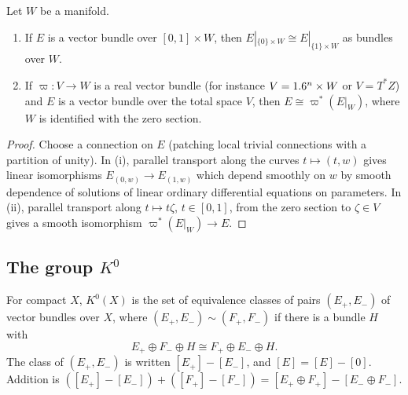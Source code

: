 \begin{lemma}\label{bott:lem:bundle-homotopy}
  Let $W$ be a manifold.
  \begin{enumerate}[label=(\roman*)]
  \item If $E$ is a vector bundle over $[0,1]\times W$, then
    $E|_{\{0\}\times W}\cong E|_{\{1\}\times W}$ as bundles over $W$.
  \item If $\varpi\colon V\to W$ is a real vector bundle (for instance $V=1.6^n\times W$
    or $V=T^*Z$) and $E$ is a vector bundle over the total space $V$, then
    $E\cong\varpi^*(E|_{W})$, where $W$ is identified with the zero section.
  \end{enumerate}
\end{lemma}
\begin{proof}
  Choose a connection on $E$ (patching local trivial connections with a partition
  of unity). In (i), parallel transport along the curves $t\mapsto(t,w)$ gives linear
  isomorphisms $E_{(0,w)}\to E_{(1,w)}$ which depend smoothly on $w$ by smooth
  dependence of solutions of linear ordinary differential equations on parameters.
  In (ii), parallel transport along $t\mapsto t\zeta$, $t\in[0,1]$, from the zero
  section to $\zeta\in V$ gives a smooth isomorphism $\varpi^*(E|_W)\to E$.
\end{proof}

\subsection{The group \texorpdfstring{$K^0$}{K0}}

\begin{definition}\label{bott:def:K0}
  For compact $X$, $K^0(X)$ is the set of equivalence classes of pairs $(E_+,E_-)$ of
  vector bundles over $X$, where $(E_+,E_-)\sim(F_+,F_-)$ if there is a bundle $H$
  with
  \begin{equation*}
    E_+\oplus F_-\oplus H\cong F_+\oplus E_-\oplus H.
  \end{equation*}
  The class of $(E_+,E_-)$ is written $[E_+]-[E_-]$, and $[E]=[E]-[0]$. Addition is
  $([E_+]-[E_-])+([F_+]-[F_-])=[E_+\oplus F_+]-[E_-\oplus F_-]$.
\end{definition}

